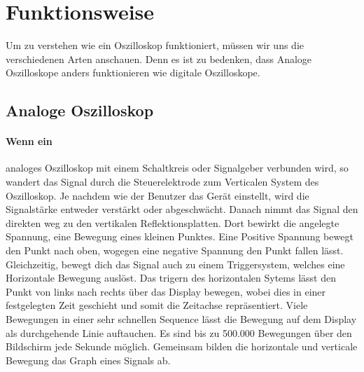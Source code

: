 \documentclass{article}
\begin{document}
\section{Funktionsweise}
Um zu verstehen wie ein Oszilloskop funktioniert, müssen wir uns die verschiedenen Arten anschauen. Denn es ist zu bedenken, dass Analoge Oszilloskope anders funktionieren wie digitale Oszilloskope.
\subsection{Analoge Oszilloskop}
\paragraph{Wenn ein}
analoges Oszilloskop mit einem Schaltkreis oder Signalgeber verbunden wird, so wandert das Signal durch die Steuerelektrode zum Verticalen System des Oszilloskop. Je nachdem wie der Benutzer das Gerät einstellt, wird die Signalstärke entweder verstärkt oder abgeschwächt. Danach nimmt das Signal den direkten weg zu den vertikalen Reflektionsplatten. Dort bewirkt die angelegte Spannung, eine Bewegung eines kleinen Punktes. Eine Positive Spannung bewegt den Punkt nach oben, wogegen eine negative Spannung den Punkt fallen lässt. Gleichzeitig, bewegt dich das Signal auch zu einem Triggersystem, welches eine Horizontale Bewegung auslöst. Das trigern des horizontalen Sytems lässt den Punkt von links nach rechts über das Display bewegen, wobei dies in einer festgelegten Zeit geschieht und somit die Zeitachse repräsentiert. Viele Bewegungen in einer sehr schnellen Sequence lässt die Bewegung auf dem Display als durchgehende Linie auftauchen. Es sind bis zu 500.000 Bewegungen über den Bildschirm jede Sekunde möglich. Gemeinsam bilden die horizontale und verticale Bewegung das Graph eines Signals ab.\cite{mcclurel}
\end{document}
